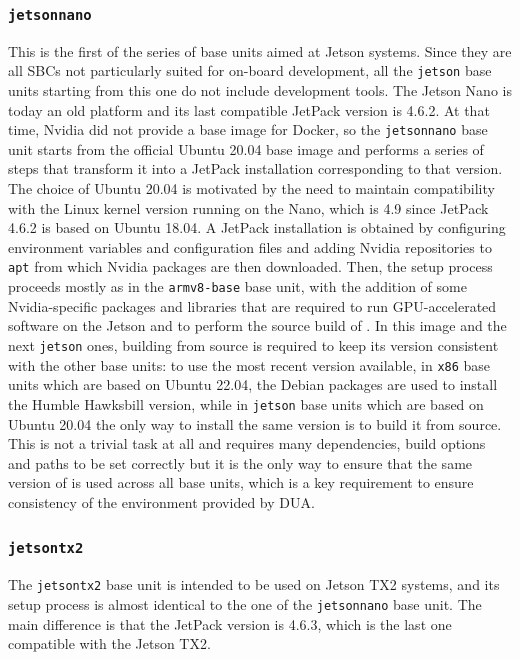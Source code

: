\subsubsection{\texttt{jetsonnano}}
\label{sec:dua_base_units_jetsonnano}
This is the first of the series of base units aimed at Jetson systems. Since they are all SBCs not particularly suited for on-board development, all the \texttt{jetson} base units starting from this one do not include development tools. The Jetson Nano is today an old platform and its last compatible JetPack version is 4.6.2. At that time, Nvidia did not provide a base image for Docker, so the \texttt{jetsonnano} base unit starts from the official Ubuntu 20.04 base image and performs a series of steps that transform it into a JetPack installation corresponding to that version. The choice of Ubuntu 20.04 is motivated by the need to maintain compatibility with the Linux kernel version running on the Nano, which is 4.9 since JetPack 4.6.2 is based on Ubuntu 18.04. A JetPack installation is obtained by configuring environment variables and configuration files and adding Nvidia repositories to \texttt{apt} from which Nvidia packages are then downloaded. Then, the setup process proceeds mostly as in the \texttt{armv8-base} base unit, with the addition of some Nvidia-specific packages and libraries that are required to run GPU-accelerated software on the Jetson and to perform the source build of \ROS. In this image and the next \texttt{jetson} ones, building \ROS from source is required to keep its version consistent with the other base units: to use the most recent \ROS version available, in \texttt{x86} base units which are based on Ubuntu 22.04, the \ROS Debian packages are used to install the Humble Hawksbill version, while in \texttt{jetson} base units which are based on Ubuntu 20.04 the only way to install the same version is to build it from source. This is not a trivial task at all and requires many dependencies, build options and paths to be set correctly but it is the only way to ensure that the same version of \ROS is used across all base units, which is a key requirement to ensure consistency of the environment provided by DUA.

\subsubsection{\texttt{jetsontx2}}
\label{sec:dua_base_units_jetsontx2}
The \texttt{jetsontx2} base unit is intended to be used on Jetson TX2 systems, and its setup process is almost identical to the one of the \texttt{jetsonnano} base unit. The main difference is that the JetPack version is 4.6.3, which is the last one compatible with the Jetson TX2.

